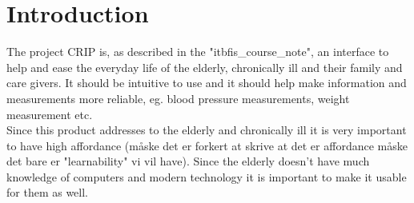 \chapter{Introduction}
The project CRIP is, as described in the "itbfis\_course\_note", an interface to help and ease the everyday life of the elderly, chronically ill and their family and care givers. It should be intuitive to use and it should help make information and measurements more reliable, eg. blood pressure measurements, weight measurement  etc. \\
Since this product addresses to the elderly and chronically ill it is very important to have high affordance (måske det er forkert at skrive at det er affordance måske det bare er "learnability" vi vil have). Since the elderly doesn't have much knowledge of computers and modern technology it is important to make it usable for them as well.